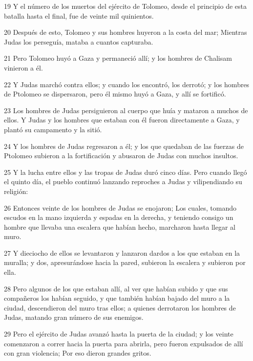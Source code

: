 \par 19 Y el número de los muertos del ejército de Tolomeo, desde el principio de esta batalla hasta el final, fue de veinte mil quinientos.

\par 20 Después de esto, Tolomeo y sus hombres huyeron a la costa del mar; Mientras Judas los perseguía, mataba a cuantos capturaba.

\par 21 Pero Tolomeo huyó a Gaza y permaneció allí; y los hombres de Chalisam vinieron a él.

\par 22 Y Judas marchó contra ellos; y cuando los encontró, los derrotó; y los hombres de Ptolomeo se dispersaron, pero él mismo huyó a Gaza, y allí se fortificó.

\par 23 Los hombres de Judas persiguieron al cuerpo que huía y mataron a muchos de ellos. Y Judas y los hombres que estaban con él fueron directamente a Gaza, y plantó su campamento y la sitió.

\par 24 Y los hombres de Judas regresaron a él; y los que quedaban de las fuerzas de Ptolomeo subieron a la fortificación y abusaron de Judas con muchos insultos.

\par 25 Y la lucha entre ellos y las tropas de Judas duró cinco días. Pero cuando llegó el quinto día, el pueblo continuó lanzando reproches a Judas y vilipendiando su religión:

\par 26 Entonces veinte de los hombres de Judas se enojaron; Los cuales, tomando escudos en la mano izquierda y espadas en la derecha, y teniendo consigo un hombre que llevaba una escalera que habían hecho, marcharon hasta llegar al muro.

\par 27 Y dieciocho de ellos se levantaron y lanzaron dardos a los que estaban en la muralla; y dos, apresurándose hacia la pared, subieron la escalera y subieron por ella.

\par 28 Pero algunos de los que estaban allí, al ver que habían subido y que sus compañeros los habían seguido, y que también habían bajado del muro a la ciudad, descendieron del muro tras ellos; a quienes derrotaron los hombres de Judas, matando gran número de sus enemigos.

\par 29 Pero el ejército de Judas avanzó hasta la puerta de la ciudad; y los veinte comenzaron a correr hacia la puerta para abrirla, pero fueron expulsados ​​de allí con gran violencia; Por eso dieron grandes gritos.

